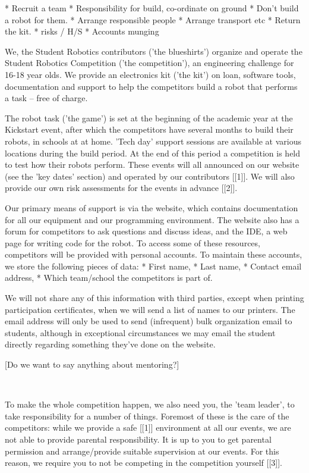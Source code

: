 \documentclass[a4paper]{article}
\begin{document}
 * Recruit a team
 * Responsibility for build, co-ordinate on ground
   * Don't build a robot for them.
 * Arrange responsible people
 * Arrange transport etc
 * Return the kit.
 * risks / H/S
 * Accounts munging
 

We, the Student Robotics contributors ('the blueshirts') organize and
operate the Student Robotics Competition ('the competition'), an
engineering challenge for 16-18 year olds. We provide an electronics kit
('the kit') on loan, software tools, documentation and support to help
the competitors build a robot that performs a task -- free of charge.

The robot task ('the game') is set at the beginning of the academic year
at the Kickstart event, after which the competitors have several months
to build their robots, in schools at at home. 'Tech day' support
sessions are available at various locations during the build period. At
the end of this period a competition is held to test how their robots
perform. These events will all announced on our website (see the 'key
dates' section) and operated by our contributors [[1]]. We will also
provide our own risk assessments for the events in advance [[2]].

Our primary means of support is via the website, which contains
documentation for all our equipment and our programming environment. The
website also has a forum for competitors to ask questions and discuss
ideas, and the IDE, a web page for writing code for the robot. To access
some of these resources, competitors will be provided with personal
accounts. To maintain these accounts, we store the following pieces of data:
 * First name,
 * Last name,
 * Contact email address,
 * Which team/school the competitors is part of.

We will not share any of this information with third parties, except
when printing participation certificates, when we will send a list of
names to our printers. The email address will only be used to send
(infrequent) bulk organization email to students, although in
exceptional circumstances we may email the student directly regarding
something they've done on the website.

[Do we want to say anything about mentoring?]

~

To make the whole competition happen, we also need you, the 'team
leader', to take responsibility for a number of things. Foremost of
these is the care of the competitors: while we provide a safe [[1]]
environment at all our events, we are not able to provide parental
responsibility. It is up to you to get parental permission and
arrange/provide suitable supervision at our events. For this reason, we
require you to not be competing in the competition yourself [[3]].
\end{document}
